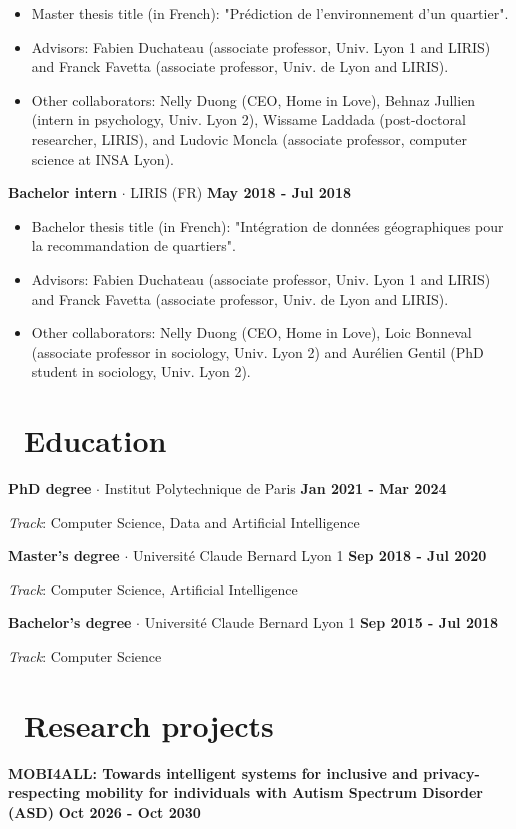 \documentclass{article}
\begin{document}
\begin{itemize}
\item Master thesis title (in French): "Prédiction de l'environnement d'un quartier".
\item Advisors: Fabien Duchateau (associate professor, Univ. Lyon 1 and LIRIS) and Franck Favetta (associate professor, Univ. de Lyon and LIRIS).
\item Other collaborators: Nelly Duong (CEO, Home in Love), Behnaz Jullien (intern in psychology, Univ. Lyon 2), Wissame Laddada (post-doctoral researcher, LIRIS), and Ludovic Moncla (associate professor, computer science at INSA Lyon).
\end{itemize}
\vspace{1em}\noindent\textbf{Bachelor intern} $\cdot$ LIRIS (FR) \hfill \textbf{May 2018 - Jul 2018}
\begin{itemize}
\item Bachelor thesis title (in French): "Intégration de données géographiques pour la recommandation de quartiers".
\item Advisors: Fabien Duchateau (associate professor, Univ. Lyon 1 and LIRIS) and Franck Favetta (associate professor, Univ. de Lyon and LIRIS).
\item Other collaborators: Nelly Duong (CEO, Home in Love), Loic Bonneval (associate professor in sociology, Univ. Lyon 2) and Aurélien Gentil (PhD student in sociology, Univ. Lyon 2).
\end{itemize}
\section*{\faGraduationCap\ Education}
\noindent\textbf{PhD degree} $\cdot$ Institut Polytechnique de Paris \hfill \textbf{Jan 2021 - Mar 2024}


\noindent\textit{Track}: Computer Science, Data and Artificial Intelligence

\vspace{1em}\noindent\textbf{Master's degree} $\cdot$ Université Claude Bernard Lyon 1 \hfill \textbf{Sep 2018 - Jul 2020}


\noindent\textit{Track}: Computer Science, Artificial Intelligence

\vspace{1em}\noindent\textbf{Bachelor's degree} $\cdot$ Université Claude Bernard Lyon 1 \hfill \textbf{Sep 2015 - Jul 2018}


\noindent\textit{Track}: Computer Science

\section*{\faLightbulbO \ Research projects}
\noindent\textbf{MOBI4ALL: Towards intelligent systems for inclusive and privacy-respecting mobility for individuals with Autism Spectrum Disorder (ASD)} \hfill \textbf{Oct 2026 - Oct 2030}
\end{document}
